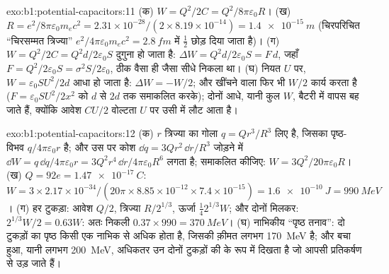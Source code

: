 \begin{solution}{exo:b1:potential-capacitors:11}
(क) $W = Q^2/2C = Q^2/8\pi\varepsilon_0R$। (ख) $R = e^2/8\pi\varepsilon_0m_ec^2 = 2.31 \times
10^{-28}/(2 \times 8.19 \times 10^{-14}) = \qty{1.4e-15}{m}$ (चिरपरिचित
``चिरसम्मत त्रिज्या'' $e^2/4\pi\varepsilon_0m_ec^2 = \qty{2.8}{fm}$ में $\tfrac12$
छोड़ दिया जाता है)। (ग) $W =
Q^2/2C = Q^2d/2\varepsilon_0S$ दुगुना हो जाता है: $\Delta W = Q^2d/2\varepsilon_0S = F\,d$, जहाँ $F =
Q^2/2\varepsilon_0S = \sigma^2S/2\varepsilon_0$, ठीक वैसा ही जैसा सीधे निकला था। (घ) नियत $U$ पर, $W =
\varepsilon_0SU^2/2d$ आधा हो जाता है: $\Delta W = -W/2$; और खींचने वाला फिर भी
$W/2$ कार्य करता है ($F = \varepsilon_0SU^2/2x^2$ को $d$ से $2d$ तक समाकलित करके);
दोनों आधे, यानी कुल $W$, बैटरी में वापस बह जाते हैं, क्योंकि आवेश $CU/2$
वोल्टता $U$ पर उसी में लौट आता है।
\end{solution}

\begin{solution}{exo:b1:potential-capacitors:12}
(क) $r$ त्रिज्या का गोला $q = Qr^3/R^3$ लिए है, जिसका पृष्ठ-विभव
$q/4\pi\varepsilon_0r$ है; और उस पर कोश $\dd q = 3Qr^2\,\dd r/R^3$ जोड़ने में $\dd W =
q\,\dd q/4\pi\varepsilon_0r = 3Q^2r^4\,\dd r/4\pi\varepsilon_0R^6$ लगता है; समाकलित कीजिए: $W =
3Q^2/20\pi\varepsilon_0R$। (ख) $Q = 92e = \qty{1.47e-17}{C}$: $W = 3 \times 2.17 \times
10^{-34}/(20\pi \times 8.85 \times 10^{-12} \times 7.4 \times 10^{-15}) = \qty{1.6e-10}{J}
= \qty{990}{MeV}$। (ग) हर टुकड़ा: आवेश $Q/2$, त्रिज्या $R/2^{1/3}$,
ऊर्जा $\tfrac14 2^{1/3}W$; और दोनों मिलकर: $2^{1/3}W/2 = 0.63W$: अतः निकली
$0.37 \times 990 = \qty{370}{MeV}$। (घ) नाभिकीय ``पृष्ठ तनाव'':
दो टुकड़ों का पृष्ठ किसी एक नाभिक से अधिक होता है, जिसकी क़ीमत लगभग
\qty{170}{MeV} है; और बचा हुआ, यानी लगभग \qty{200}{MeV}, अधिकतर उन दोनों
टुकड़ों की  के रूप में दिखता है जो आपसी प्रतिकर्षण से उड़ जाते हैं।
\end{solution}

